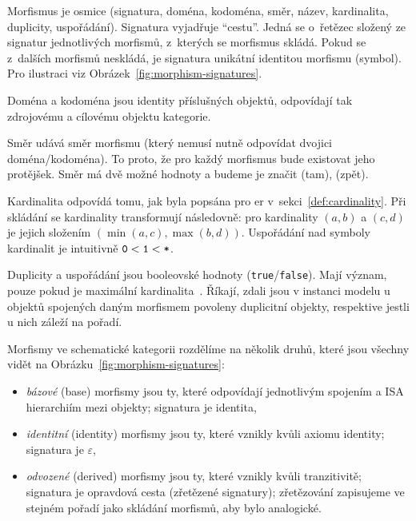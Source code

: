 Morfismus je osmice (signatura, doména, kodoména, směr, název, kardinalita, duplicity, uspořádání).
Signatura vyjadřuje \enquote{cestu}.
Jedná se o~řetězec složený ze signatur jednotlivých morfismů, z~kterých se morfismus skládá.
Pokud se z~dalších morfismů neskládá, je signatura unikátní identitou morfismu (symbol).
Pro ilustraci viz Obrázek~\ref{fig:morphism-signatures}.

Doména a kodoména jsou identity příslušných objektů, odpovídají tak zdrojovému a cílovému objektu kategorie.

Směr udává směr morfismu (který nemusí nutně odpovídat dvojici doména/kodoména).
To proto, že pro každý morfismus bude existovat jeho protějšek.
Směr má dvě možné hodnoty a budeme je značit \one{} (tam), \zero{} (zpět).

Kardinalita odpovídá tomu, jak byla popsána pro \acrshort{er} v~sekci~\ref{def:cardinality}.
Při skládání se kardinality transformují následovně: pro kardinality $(a, b)$ a $(c, d)$ je jejich složením $(\min(a, c), \max(b, d))$.
Uspořádání nad symboly kardinalit je intuitivně $\texttt{0} < \texttt{1} < \texttt{*}$.

Duplicity a uspořádání jsou booleovské hodnoty (\texttt{true}/\texttt{false}).
Mají význam, pouze pokud je maximální kardinalita~\many.
Říkají, zdali jsou v instanci modelu u objektů spojených daným morfismem povoleny duplicitní objekty, respektive jestli u nich záleží na pořadí.

Morfismy ve schematické kategorii rozdělíme na několik druhů, které jsou všechny vidět na Obrázku~\ref{fig:morphism-signatures}:
\begin{itemize}
  \item \emph{bázové} (base) morfismy jsou ty, které odpovídají jednotlivým spojením a ISA hierarchiím mezi objekty; signatura je identita,
  \item \emph{identitní} (identity) morfismy jsou ty, které vznikly kvůli axiomu identity; signatura je $\varepsilon$,
  \item \emph{odvozené} (derived) morfismy jsou ty, které vznikly kvůli tranzitivitě; signatura je opravdová cesta (zřetězené signatury); zřetězování zapisujeme ve stejném pořadí jako skládání morfismů, aby bylo analogické.
\end{itemize}

